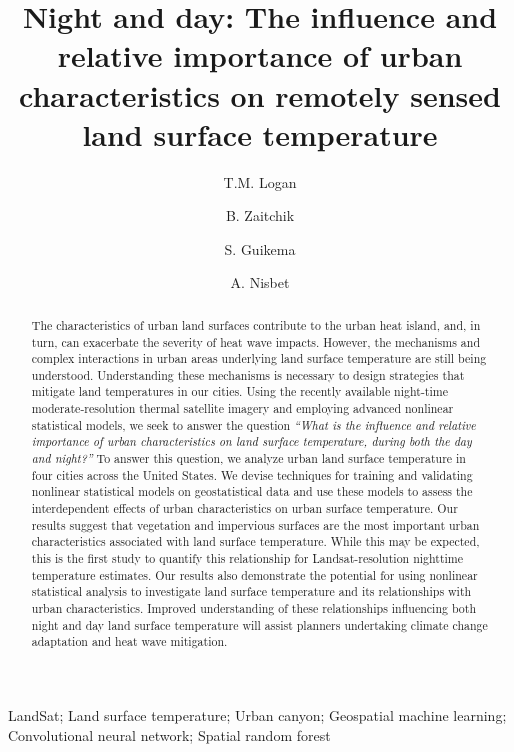 \documentclass[final,3p,times,onecolumn,sort&compress]{elsarticle}
\begin{document}
\begin{frontmatter}

\title{Night and day: The influence and relative importance of urban characteristics on remotely sensed land surface temperature}

\author[1]{T.M. Logan}

\author[2]{B. Zaitchik}
\author[3]{S. Guikema}
\author[4]{A. Nisbet}

\address[1]{Civil and Natural Resources Engineering, University of Canterbury, New Zealand}
\address[2]{Earth and Planetary Sciences, Johns Hopkins University, Baltimore, MD}
\address[3]{Industrial and Operations Engineering, University of Michigan, Ann Arbor, MI}
\address[4]{www.ajnisbet.com}

\begin{abstract}
The characteristics of urban land surfaces contribute to the urban heat island, and, in turn, can exacerbate the severity of heat wave impacts.
However, the mechanisms and complex interactions in urban areas underlying land surface temperature are still being understood.
Understanding these mechanisms is necessary to design strategies that mitigate land temperatures in our cities.
Using the recently available night-time moderate-resolution thermal satellite imagery and employing advanced nonlinear statistical models, we seek to answer the question \textit{``What is the influence and relative importance of urban characteristics on land surface temperature, during both the day and night?''} 
To answer this question, we analyze urban land surface temperature in four cities across the United States.
We devise techniques for training and validating nonlinear statistical models on geostatistical data and use these models to assess the interdependent effects of urban characteristics on urban surface temperature.
Our results suggest that vegetation and impervious surfaces are the most important urban characteristics associated with land surface temperature.
While this may be expected, this is the first study to quantify this relationship for Landsat-resolution nighttime temperature estimates.
Our results also demonstrate the potential for using nonlinear statistical analysis to investigate land surface temperature and its relationships with urban characteristics. 
Improved understanding of these relationships influencing both night and day land surface temperature will assist planners undertaking climate change adaptation and heat wave mitigation.
\end{abstract}

\begin{keyword}
LandSat; Land surface temperature; Urban canyon; Geospatial machine learning; Convolutional neural network; Spatial random forest
\end{keyword}

\end{frontmatter}
\end{document}

